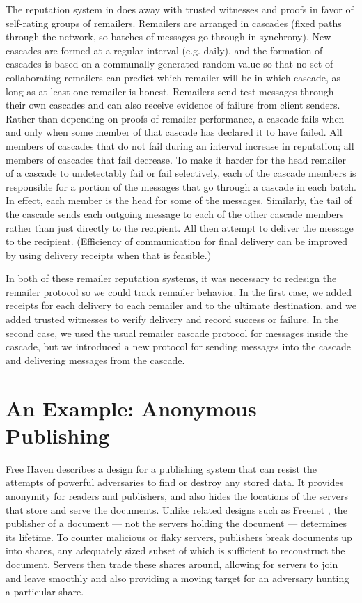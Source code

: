 \documentclass[times,10pt,twocolumn]{article}
\begin{document}
The reputation system in \cite{casc-rep} does
away with trusted witnesses and proofs in favor of self-rating groups
of remailers. Remailers are arranged in cascades (fixed paths through the
network, so batches of messages go through in synchrony).
New cascades are formed at a regular interval (e.g. daily),
and the formation of cascades is based on a communally generated
random value so that no set of collaborating remailers can predict which
remailer will be in which cascade, as long as at least one remailer is
honest. Remailers send test messages through their own cascades and
can also receive evidence of failure from client senders. Rather than
depending on proofs of remailer performance, a cascade fails when and
only when some member of that cascade has declared it to have failed. All
members of cascades that do not fail during an interval increase in
reputation; all members of cascades that fail decrease. To make it
harder for the head remailer of a cascade to undetectably fail or fail
selectively, each of the cascade members is responsible for a portion of
the messages that go through a cascade in each batch. In effect, each
member is the head for some of the messages. Similarly, the tail of
the cascade sends each outgoing message to each of the other cascade
members rather than just directly to the recipient. All then attempt to
deliver the message to the recipient. (Efficiency of communication for
final delivery can be improved by using delivery receipts when that is feasible.)

In both of these remailer reputation systems, it was necessary to redesign the
remailer protocol so we could track remailer behavior. In the first
case, we added receipts for each delivery to each remailer and to
the ultimate destination, and we added trusted witnesses to verify
delivery and record success or failure. In the second case, we used
the usual remailer cascade protocol for messages inside the cascade,
but we introduced a new protocol for sending messages into the cascade
and delivering messages from the cascade.

\section{An Example: Anonymous Publishing}

Free Haven \cite{freehaven-berk} describes a design for a publishing
system that can resist the attempts of powerful adversaries to find or
destroy any stored data. It provides anonymity for readers and publishers,
and also hides the locations of the servers that store and serve the
documents. Unlike related designs such as Freenet \cite{freenet},
the publisher of a document --- not the servers holding the document
--- determines its lifetime. To counter malicious or flaky servers,
publishers break documents up into shares, any adequately sized subset of
which is sufficient to reconstruct the document. Servers then trade these
shares around, allowing for servers to join and leave smoothly and also
providing a moving target for an adversary hunting a particular share.
\end{document}
